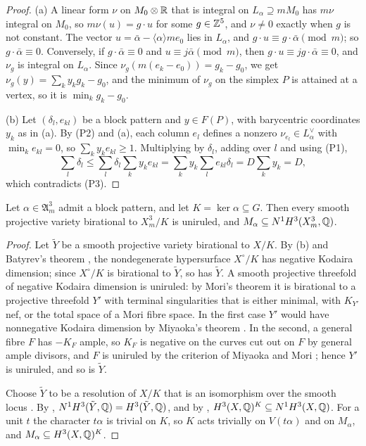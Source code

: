 \begin{proof}
(a) A linear form $\nu$ on $M_{0}\otimes\mathbb{R}$ that is integral on
$L_{\alpha}\supseteq mM_{0}$ has $m\nu$ integral on $M_{0}$, so $m\nu(u)=
g\cdot u$ for some $g\in\mathbb{Z}^{5}$, and $\nu\ne0$ exactly when $g$ is not
constant. The vector $u=\bar\alpha-\langle\alpha\rangle me_{0}$ lies in
$L_{\alpha}$, and $g\cdot u\equiv g\cdot\bar\alpha\pmod m$; so
$g\cdot\bar\alpha\equiv0$. Conversely, if $g\cdot\bar\alpha\equiv0$ and
$u\equiv j\bar\alpha\pmod m$, then $g\cdot u\equiv jg\cdot\bar\alpha\equiv0$,
and $\nu_{g}$ is integral on $L_{\alpha}$. Since $\nu_{g}(m(e_{k}-e_{0}))=
g_{k}-g_{0}$, we get $\nu_{g}(y)=\sum_{k}y_{k}g_{k}-g_{0}$, and the minimum
of $\nu_{g}$ on the simplex $P$ is attained at a vertex, so it is
$\min_{k}g_{k}-g_{0}$.

(b) Let $(\delta_{l},e_{kl})$ be a block pattern and $y\in F(P)$, with
barycentric coordinates $y_{k}$ as in (a). By (P2) and (a), each column
$e_{l}$ defines a nonzero $\nu_{e_{l}}\in L_{\alpha}^{\vee}$ with
$\min_{k}e_{kl}=0$, so $\sum_{k}y_{k}e_{kl}\ge1$. Multiplying by $\delta_{l}$,
adding over $l$ and using (P1),
\[
  \sum_{l}\delta_{l}\le\sum_{l}\delta_{l}\sum_{k}y_{k}e_{kl}=\sum_{k}y_{k}
  \sum_{l}e_{kl}\delta_{l}=D\sum_{k}y_{k}=D,
\]
which contradicts (P3).
\end{proof}

\begin{theorem}\label{thm:uniruled}
Let $\alpha\in\mathfrak A^{3}_{m}$ admit a block pattern, and let
$K=\ker\alpha\subseteq G$. Then every smooth projective variety birational to
$X^{3}_{m}/K$ is uniruled, and $M_{\alpha}\subseteq N^{1}H^{3}(X^{3}_{m},
\mathbb{Q})$.
\end{theorem}

\begin{proof}
Let $\tilde Y$ be a smooth projective variety birational to $X/K$. By
(b) and Batyrev's theorem \cite[Corollary~5.6]{Bat24}, the
nondegenerate hypersurface $X^{\circ}/K$ has negative Kodaira dimension;
since $X^{\circ}/K$ is birational to $\tilde Y$, so has $\tilde Y$. A smooth
projective threefold of negative Kodaira dimension is uniruled: by Mori's
theorem \cite{Mor88} it is birational to a projective threefold $Y'$ with
terminal singularities that is either minimal, with $K_{Y'}$ nef, or the
total space of a Mori fibre space. In the first case $Y'$ would have
nonnegative Kodaira dimension by Miyaoka's theorem \cite{Miy88}. In the
second, a general fibre $F$ has $-K_{F}$ ample, so $K_{F}$ is negative on
the curves cut out on $F$ by general ample divisors, and $F$ is uniruled by
the criterion of Miyaoka and Mori \cite{MM86}; hence $Y'$ is uniruled, and so
is $\tilde Y$.

Choose $\tilde Y$ to be a resolution of $X/K$ that is an isomorphism over
the smooth locus \cite{Hir64}. By ,
$N^{1}H^{3}(\tilde Y,\mathbb{Q})=H^{3}(\tilde Y,\mathbb{Q})$, and by
, $H^{3}(X,\mathbb{Q})^{K}\subseteq N^{1}H^{3}(X,\mathbb{Q})$. For a
unit $t$ the character $t\alpha$ is trivial on $K$, so $K$ acts trivially on
$V(t\alpha)$ and on $M_{\alpha}$, and $M_{\alpha}\subseteq H^{3}(X,\mathbb{Q})^{K}$.
\end{proof}

